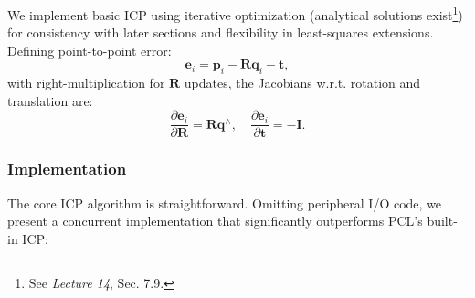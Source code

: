 We implement basic ICP using iterative optimization (analytical solutions exist\footnote{See \textit{Lecture 14}, Sec. 7.9.}) for consistency with later sections and flexibility in least-squares extensions. Defining point-to-point error:  
\begin{equation}\label{key}  
	\mathbf{e}_i = \mathbf{p}_i - \mathbf{R} \mathbf{q}_i - \mathbf{t},  
\end{equation}  
with right-multiplication for $\mathbf{R}$ updates, the Jacobians w.r.t. rotation and translation are:  
\begin{equation}\label{eq:p2p-icp-jacobian}  
	\frac{\partial \mathbf{e}_i}{\partial \mathbf{R}} = \mathbf{R} \mathbf{q}^\wedge, \quad \frac{\partial \mathbf{e}_i}{\partial \mathbf{t}} = -\mathbf{I}.  
\end{equation}

\subsubsection{Implementation}
The core ICP algorithm is straightforward. Omitting peripheral I/O code, we present a concurrent implementation that significantly outperforms PCL's built-in ICP:

